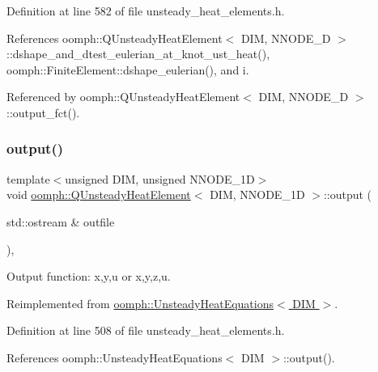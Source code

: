 Definition at line 582 of file unsteady\+\_\+heat\+\_\+elements.\+h.



References oomph\+::\+Q\+Unsteady\+Heat\+Element$<$ D\+I\+M, N\+N\+O\+D\+E\+\_\+D $>$\+::dshape\+\_\+and\+\_\+dtest\+\_\+eulerian\+\_\+at\+\_\+knot\+\_\+ust\+\_\+heat(), oomph\+::\+Finite\+Element\+::dshape\+\_\+eulerian(), and i.



Referenced by oomph\+::\+Q\+Unsteady\+Heat\+Element$<$ D\+I\+M, N\+N\+O\+D\+E\+\_\+D $>$\+::output\+\_\+fct().

\mbox{\label{classoomph_1_1QUnsteadyHeatElement_a50c15ed85f1200ac8e81192cc4b5584f}} 
\subsubsection{\texorpdfstring{output()}{output()}\hspace{0.1cm}{\footnotesize\ttfamily [1/4]}}
{\footnotesize\ttfamily template$<$unsigned D\+IM, unsigned N\+N\+O\+D\+E\+\_\+1D$>$ \\
void \hyperlink{classoomph_1_1QUnsteadyHeatElement}{oomph\+::\+Q\+Unsteady\+Heat\+Element}$<$ D\+IM, N\+N\+O\+D\+E\+\_\+1D $>$\+::output (\begin{DoxyParamCaption}\item[{std\+::ostream \&}]{outfile }\end{DoxyParamCaption})\hspace{0.3cm}{\ttfamily [inline]}, {\ttfamily [virtual]}}



Output function\+: x,y,u or x,y,z,u. 



Reimplemented from \hyperlink{classoomph_1_1UnsteadyHeatEquations_a1d73897c7329f0b82f29542cb5c72fff}{oomph\+::\+Unsteady\+Heat\+Equations$<$ D\+I\+M $>$}.



Definition at line 508 of file unsteady\+\_\+heat\+\_\+elements.\+h.



References oomph\+::\+Unsteady\+Heat\+Equations$<$ D\+I\+M $>$\+::output().

\mbox{\label{classoomph_1_1QUnsteadyHeatElement_ae54ed4ee8b36659f7498a4bef75f35c2}} 
